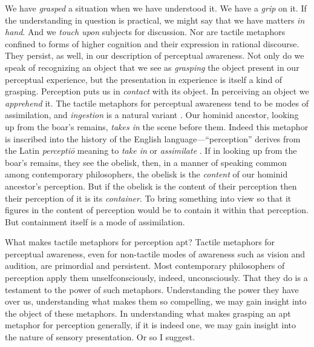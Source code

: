 We have \emph{grasped} a situation when we have understood it. We have a \emph{grip} on it. If the understanding in question is practical, we might say that we have matters \emph{in hand}. And we \emph{touch upon} subjects for discussion. Nor are tactile metaphors confined to forms of higher cognition and their expression in rational discourse. They persist, as well, in our description of perceptual awareness. Not only do we speak of recognizing an object that we see as \emph{grasping} the object present in our perceptual experience, but the presentation in experience is itself a kind of grasping. Perception puts us in \emph{contact} with its object. In perceiving an object we \emph{apprehend} it. The tactile metaphors for perceptual awareness tend to be modes of assimilation, and \emph{ingestion} is a natural variant \citep[see][]{Johnston:2006uq,Price:1932fk}. Our hominid ancestor, looking up from the boar's remains, \emph{takes in} the scene before them. Indeed this metaphor is inscribed into the history of the English language---``perception'' derives from the Latin \emph{perceptiō} meaning to \emph{take in} or \emph{assimilate} \citep[102]{Burnyeat:1979mv}. If in looking up from the boar's remains, they see the obelisk, then, in a manner of speaking common among contemporary philosophers, the obelisk is the \emph{content} of our hominid ancestor's perception. But if the obelisk is the content of their perception then their perception of it is its \emph{container}. To bring something into view so that it figures in the content of perception would be to contain it within that perception. But containment itself is a mode of assimilation. 

What makes tactile metaphors for perception apt? Tactile metaphors for perceptual awareness, even for non-tactile modes of awareness such as vision and audition, are primordial and persistent. Most contemporary philosophers of perception apply them unselfconsciously, indeed, unconsciously. That they do is a testament to the power of such metaphors. Understanding the power they have over us, understanding what makes them so compelling, we may gain insight into the object of these metaphors. In understanding what makes grasping an apt metaphor for perception generally, if it is indeed one, we may gain insight into the nature of sensory presentation. Or so I suggest.

